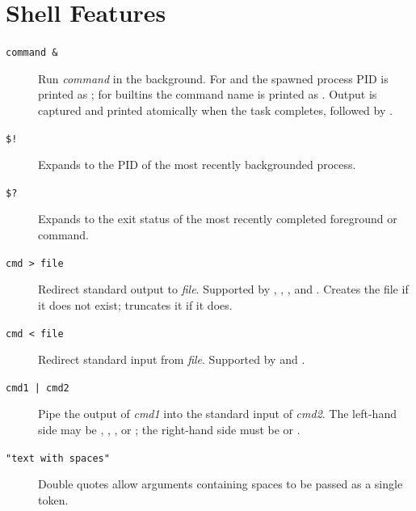 \section*{Shell Features}

\begin{description}

\item[\texttt{command \&}]
Run \textit{command} in the background. For  and  the
spawned process PID is printed as ; for builtins the command
name is printed as . Output is captured and printed atomically
when the task completes, followed by .

\item[\texttt{\$!}]
Expands to the PID of the most recently backgrounded process.

\item[\texttt{\$?}]
Expands to the exit status of the most recently completed foreground
 or  command.

\item[\texttt{cmd > file}]
Redirect standard output to \textit{file}. Supported by ,
, , and . Creates the file if it does not
exist; truncates it if it does.

\item[\texttt{cmd < file}]
Redirect standard input from \textit{file}. Supported by  and
.

\item[\texttt{cmd1 | cmd2}]
Pipe the output of \textit{cmd1} into the standard input of \textit{cmd2}.
The left-hand side may be , , , or ;
the right-hand side must be  or .

\item[\texttt{"text with spaces"}]
Double quotes allow arguments containing spaces to be passed as a single
token.

\end{description}